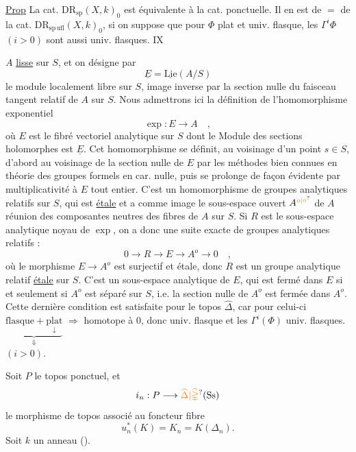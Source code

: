 \uline{Prop} La cat. $\mathrm{DR}_{\mathrm{sp}}(X,k)_0$ est équivalente à la cat. ponctuelle. Il en est de $=$ de la cat. $\mathrm{DR}_{\mathrm{sp\,ufl}}(X,k)_0$, si on suppose que pour   $\Phi$ plat et univ. flasque, les $\Gamma^i\Phi$ $(i>0)$ sont aussi univ. flasques.
\hfill IX

$A$ \uline{lisse} sur $S$, et on désigne par
\[
 \underline E=\underline{\mathrm{Lie}}(A/S)\tag*{(13.1.1)}
\]
le module localement libre sur $S$, image inverse par la section nulle du faisceau tangent relatif de $A$ sur $S$. Nous admettrons ici la définition de l'homomorphisme exponentiel
\[
 \exp:E\longrightarrow A\quad,\tag*{(13.1.2)}
\]
où $E$ est le fibré vectoriel analytique sur $S$ dont le Module des sections holomorphes est $\underline E$. Cet homomorphisme se définit, au voisinage d'un point $s\in S$, d'abord au voisinage de la section nulle de $E$ par les méthodes bien connues en théorie des groupes formels en car. nulle, puis se prolonge de façon évidente par multiplicativité à $E$ tout entier. C'est un homomorphisme de groupes analytiques relatifs sur $S$, qui est \uline{étale} et a comme image le sous-espace ouvert $A^{\unsure{o|\circ}}$ de $A$ réunion des composantes neutres des fibres de $A$ sur $S$. Si $R$ est le sous-espace analytique noyau de $\exp$, on a donc une suite exacte de groupes analytiques relatifs :
\[
 0\longrightarrow R\longrightarrow E\longrightarrow A^o\longrightarrow0\quad,\tag*{(13.1.3)}
\]
où le morphisme $E\longrightarrow A^o$ est surjectif et étale, donc $R$ est un groupe analytique relatif \uline{étale} sur $S$. C'est un sous-espace analytique de $E$, qui est fermé dans $E$ si et seulement si $A^o$ est séparé sur $S$, i.e. la section nulle de $A^o$ est fermée dans $A^o$.
Cette dernière condition est satisfaite pour le topos  $\widehat\Delta$, car pour celui-ci
$\underbrace{\text{flasque}+\underset{\downarrow}{\text{plat}}}_{\Downarrow}$  $\Longrightarrow$ homotope à $0$, donc univ. flasque et les $\Gamma^i(\Phi)$ univ. flasques. $(i>0)$.

Soit $P$ le topos ponctuel, et
\[
 i_n:P\longrightarrow\unsure{\widehat\Delta|\widehat{\mathbb\Delta}}(\mathrm{Ss})
\]
le morphisme de topos associé au foncteur fibre
\[
 u_n^*(K)=K_n=K(\Delta_n).
\]
Soit $k$ un anneau ().

